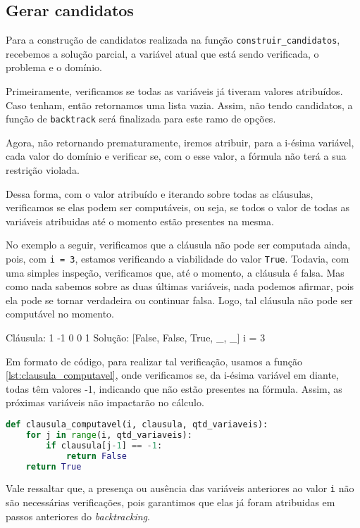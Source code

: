 \documentclass[12pt]{article}
\begin{document}
    \subsection{Gerar candidatos}
    \par Para a construção de candidatos realizada na função \verb|construir_candidatos|, recebemos a solução parcial, a variável atual que está sendo verificada, o problema e o domínio.
    \par Primeiramente, verificamos se todas as variáveis já tiveram valores atribuídos. Caso tenham, então retornamos uma lista vazia. Assim, não tendo candidatos, a função de \verb|backtrack| será finalizada para este ramo de opções.
    \par Agora, não retornando prematuramente, iremos atribuir, para a i-ésima variável, cada valor do domínio e verificar se, com o esse valor, a fórmula não terá a sua restrição violada.

    \par Dessa forma, com o valor atribuído e iterando sobre todas as cláusulas, verificamos se elas podem ser computáveis, ou seja, se todos o valor de todas as variáveis atribuidas até o momento estão presentes na mesma.
    \par No exemplo a seguir, verificamos que a cláusula não pode ser computada ainda, pois, com \verb|i = 3|, estamos verificando a viabilidade do valor \verb|True|. Todavia, com uma simples inspeção, verificamos que, até o momento, a cláusula é falsa. Mas como nada sabemos sobre as duas últimas variáveis, nada podemos afirmar, pois ela pode se tornar verdadeira ou continuar falsa. Logo, tal cláusula não pode ser computável no momento.
    \begin{tcolorbox}[width=\linewidth, fontupper=\ttfamily,  halign=flush left]
        Cláusula: 1 -1 0 0 1 \newline 
        Solução: [False, False, True, \_, \_] \newline
        i = 3
    \end{tcolorbox}

    \par Em formato de código, para realizar tal verificação, usamos a função \ref{lst:clausula_computavel}, onde verificamos se, da i-ésima variável em diante, todas têm valores -1, indicando que não estão presentes na fórmula. Assim, as próximas variáveis não impactarão no cálculo.


\begin{lstlisting}[caption={Verificando se cláusula é computável},label={lst:clausula_computavel}, language=Python]
def clausula_computavel(i, clausula, qtd_variaveis):  
    for j in range(i, qtd_variaveis):
        if clausula[j-1] == -1:
            return False
    return True

 \end{lstlisting}
    \par Vale ressaltar que, a presença ou ausência das variáveis anteriores ao valor \verb|i| não são necessárias verificações, pois garantimos que elas já foram atribuidas em passos anteriores do \textit{backtracking}.
\end{document}
